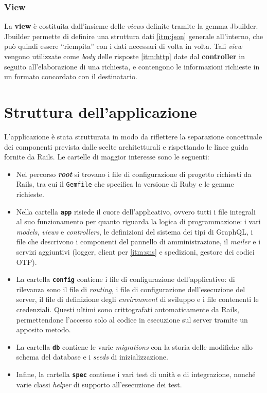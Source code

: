\subsubsection{View}
La \textbf{view} è costituita dall'insieme delle \textit{views} definite tramite la gemma Jbuilder. Jbuilder permette di definire una struttura dati \ref{itm:json} generale all'interno, che può quindi essere ``riempita'' con i dati necessari di volta in volta. Tali \textit{view} vengono utilizzate come \textit{body} delle risposte \ref{itm:http} date dal \textbf{controller} in seguito all'elaborazione di una richiesta, e contengono le informazioni richieste in un formato concordato con il destinatario.

\section{Struttura dell'applicazione}
L'applicazione è stata strutturata in modo da riflettere la separazione concettuale dei componenti prevista dalle scelte architetturali e rispettando le linee guida fornite da Rails. Le cartelle di maggior interesse sono le seguenti:
\begin{itemize}
    \item Nel percorso \textbf{\textit{root}} si trovano i file di configurazione di progetto richiesti da Rails, tra cui il \texttt{Gemfile} che specifica la versione di Ruby e le gemme richieste.
    \item Nella cartella \textbf{\texttt{app}} risiede il cuore dell'applicativo, ovvero tutti i file integrali al suo funzionamento per quanto riguarda la logica di programmazione: i vari \textit{models}, \textit{views} e \textit{controllers}, le definizioni del sistema dei tipi di GraphQL, i file che descrivono i componenti del pannello di amministrazione, il \textit{mailer} e i servizi aggiuntivi (logger, client per \ref{itm:sns} e spedizioni, gestore dei codici OTP).
    \item La cartella \textbf{\texttt{config}} contiene i file di configurazione dell'applicativo: di rilevanza sono il file di \textit{routing}, i file di configurazione dell'esecuzione del server, il file di definizione degli \textit{environment} di sviluppo e i file contenenti le credenziali. Questi ultimi sono crittografati automaticamente da Rails, permettendone l'accesso solo al codice in esecuzione sul server tramite un apposito metodo.
    \item La cartella \textbf{\texttt{db}} contiene le varie \textit{migrations} con la storia delle modifiche allo schema del database e i \textit{seeds} di inizializzazione.
    \item Infine, la cartella \textbf{\texttt{spec}} contiene i vari test di unità e di integrazione, nonché varie classi \textit{helper} di supporto all'esecuzione dei test. 
\end{itemize}
\vspace{-20pt}
